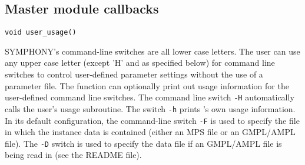 

\subsection{Master module callbacks}

\bd


\label{user_usage}
\begin{verbatim}
void user_usage()
\end{verbatim}

\bd

\describe

SYMPHONY's command-line switches are all lower case letters. The user can use
any upper case letter (except 'H' and as specified below) for command line
switches to control user-defined parameter settings without the use of a
parameter file. The function  can optionally print out
usage information for the user-defined command line switches. The command line
switch {\tt -H} automatically calls the user's usage subroutine. The switch
{\tt -h} prints \BB's own usage information. In its default configuration, the
command-line switch \texttt{-F} is used to specify the file in which the
instance data is contained (either an MPS file or an GMPL/AMPL file). The
\texttt{-D} switch is used to specify the data file if an GMPL/AMPL file is
being read in (see the README file).

